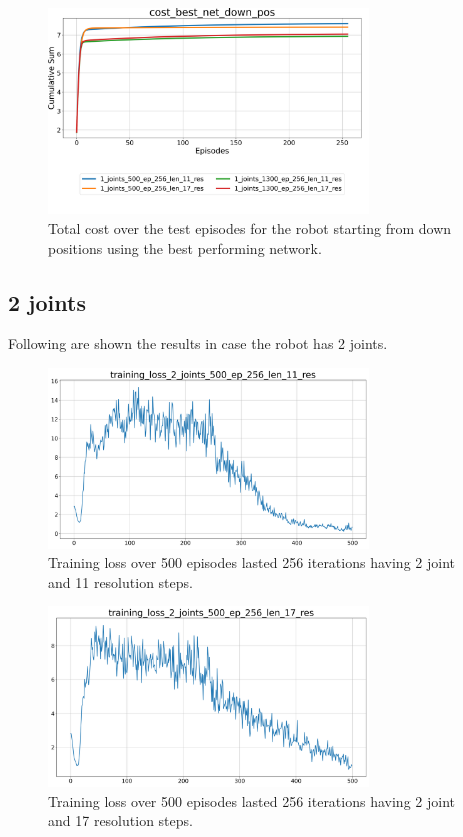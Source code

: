 \documentclass[twocolumn, a4paper]{article}
\begin{document}
\begin{figure}[H]
	\centering
	\includegraphics[width=8.5cm]{"../Figures/Summary_cost_best_net_down_pos_1J.png"}
	\caption{Total cost over the test episodes for the robot starting from
			 down positions using the best performing network.}
	\label{fig:Test_1_best_net_down_pos}
\end{figure}

\subsection{2 joints}
Following are shown the results in case the robot has 2 joints.

\begin{figure}[H]
	\centering
	\includegraphics[width=8.5cm]{"../Figures/training_loss_2J_500E_256EL_11RES.png"}
	\caption{Training loss over 500 episodes lasted 256 iterations having 2
			 joint and 11 resolution steps.}
	\label{fig:TrainLoss_2_500_11}
\end{figure}

\begin{figure}[H]
	\centering
	\includegraphics[width=8.5cm]{"../Figures/training_loss_2J_500E_256EL_17RES.png"}
	\caption{Training loss over 500 episodes lasted 256 iterations having 2
			 joint and 17 resolution steps.}
	\label{fig:TrainLoss_2_500_17}
\end{figure}
\vspace{-1cm}
\end{document}
